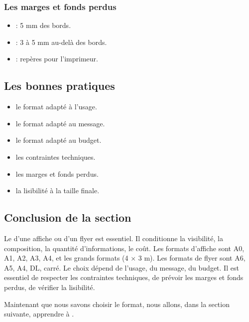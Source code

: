 \subsubsection{Les marges et fonds perdus}

\begin{itemize}
    \item {} : 5 mm des bords.
    \item {} : 3 à 5 mm au-delà des bords.
    \item {} : repères pour l'imprimeur.
\end{itemize}

\subsection{Les bonnes pratiques}

\begin{itemize}
    \item {} le format adapté à l'usage.
    \item {} le format adapté au message.
    \item {} le format adapté au budget.
    \item {} les contraintes techniques.
    \item {} les marges et fonds perdus.
    \item {} la lisibilité à la taille finale.
\end{itemize}

\subsection*{Conclusion de la section}

Le  d'une affiche ou d'un flyer est essentiel. Il conditionne la visibilité, la composition, la quantité d'informations, le coût. Les formats d'affiche sont A0, A1, A2, A3, A4, et les grands formats (4 × 3 m). Les formats de flyer sont A6, A5, A4, DL, carré. Le choix dépend de l'usage, du message, du budget. Il est essentiel de respecter les contraintes techniques, de prévoir les marges et fonds perdus, de vérifier la lisibilité.

Maintenant que nous savons choisir le format, nous allons, dans la section suivante, apprendre à .

